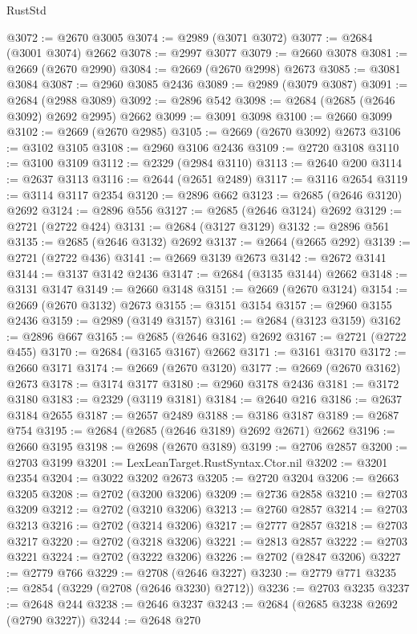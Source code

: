 \begin{lexlean}{RustStd}
\begin{coremodule}
@3072 := @2670 @3005
@3074 := @2989 (@3071 @3072)
@3077 := @2684 (@3001 @3074) @2662
@3078 := @2997 @3077
@3079 := @2660 @3078
@3081 := @2669 (@2670 @2990)
@3084 := @2669 (@2670 @2998) @2673
@3085 := @3081 @3084
@3087 := @2960 @3085 @2436
@3089 := @2989 (@3079 @3087)
@3091 := @2684 (@2988 @3089)
@3092 := @2896 @542
@3098 := @2684 (@2685 (@2646 @3092) @2692 @2995) @2662
@3099 := @3091 @3098
@3100 := @2660 @3099
@3102 := @2669 (@2670 @2985)
@3105 := @2669 (@2670 @3092) @2673
@3106 := @3102 @3105
@3108 := @2960 @3106 @2436
@3109 := @2720 @3108
@3110 := @3100 @3109
@3112 := @2329 (@2984 @3110)
@3113 := @2640 @200
@3114 := @2637 @3113
@3116 := @2644 (@2651 @2489)
@3117 := @3116 @2654
@3119 := @3114 @3117 @2354
@3120 := @2896 @662
@3123 := @2685 (@2646 @3120) @2692
@3124 := @2896 @556
@3127 := @2685 (@2646 @3124) @2692
@3129 := @2721 (@2722 @424)
@3131 := @2684 (@3127 @3129)
@3132 := @2896 @561
@3135 := @2685 (@2646 @3132) @2692
@3137 := @2664 (@2665 @292)
@3139 := @2721 (@2722 @436)
@3141 := @2669 @3139 @2673
@3142 := @2672 @3141
@3144 := @3137 @3142 @2436
@3147 := @2684 (@3135 @3144) @2662
@3148 := @3131 @3147
@3149 := @2660 @3148
@3151 := @2669 (@2670 @3124)
@3154 := @2669 (@2670 @3132) @2673
@3155 := @3151 @3154
@3157 := @2960 @3155 @2436
@3159 := @2989 (@3149 @3157)
@3161 := @2684 (@3123 @3159)
@3162 := @2896 @667
@3165 := @2685 (@2646 @3162) @2692
@3167 := @2721 (@2722 @455)
@3170 := @2684 (@3165 @3167) @2662
@3171 := @3161 @3170
@3172 := @2660 @3171
@3174 := @2669 (@2670 @3120)
@3177 := @2669 (@2670 @3162) @2673
@3178 := @3174 @3177
@3180 := @2960 @3178 @2436
@3181 := @3172 @3180
@3183 := @2329 (@3119 @3181)
@3184 := @2640 @216
@3186 := @2637 @3184 @2655
@3187 := @2657 @2489
@3188 := @3186 @3187
@3189 := @2687 @754
@3195 := @2684 (@2685 (@2646 @3189) @2692 @2671) @2662
@3196 := @2660 @3195
@3198 := @2698 (@2670 @3189)
@3199 := @2706 @2857
@3200 := @2703 @3199
@3201 := LexLeanTarget.RustSyntax.Ctor.nil
@3202 := @3201 @2354
@3204 := @3022 @3202 @2673
@3205 := @2720 @3204
@3206 := @2663 @3205
@3208 := @2702 (@3200 @3206)
@3209 := @2736 @2858
@3210 := @2703 @3209
@3212 := @2702 (@3210 @3206)
@3213 := @2760 @2857
@3214 := @2703 @3213
@3216 := @2702 (@3214 @3206)
@3217 := @2777 @2857
@3218 := @2703 @3217
@3220 := @2702 (@3218 @3206)
@3221 := @2813 @2857
@3222 := @2703 @3221
@3224 := @2702 (@3222 @3206)
@3226 := @2702 (@2847 @3206)
@3227 := @2779 @766
@3229 := @2708 (@2646 @3227)
@3230 := @2779 @771
@3235 := @2854 (@3229 (@2708 (@2646 @3230) @2712))
@3236 := @2703 @3235
@3237 := @2648 @244
@3238 := @2646 @3237
@3243 := @2684 (@2685 @3238 @2692 (@2790 @3227))
@3244 := @2648 @270

\end{coremodule}
\end{lexlean}
